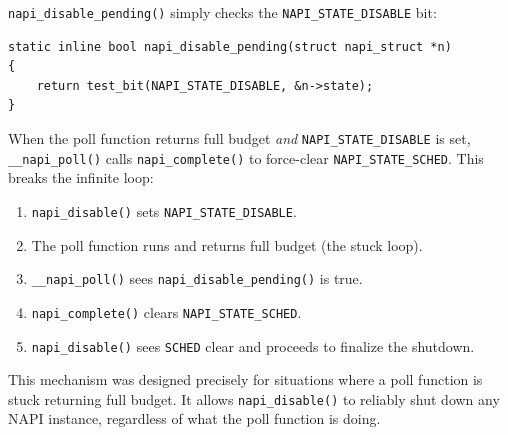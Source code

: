 \documentclass[11pt,a4paper,openany]{book}
\newcommand{\func}[1]{\texttt{#1()}}
\newcommand{\flag}[1]{\texttt{#1}}
\begin{document}
\func{napi\_disable\_pending} simply checks the \flag{NAPI\_STATE\_DISABLE}
bit:

\begin{lstlisting}[caption={\texttt{napi\_disable\_pending()} (include/linux/netdevice.h)}]
static inline bool napi_disable_pending(struct napi_struct *n)
{
    return test_bit(NAPI_STATE_DISABLE, &n->state);
}
\end{lstlisting}

When the poll function returns full budget \emph{and}
\flag{NAPI\_STATE\_DISABLE} is set, \func{\_\_napi\_poll} calls
\func{napi\_complete} to force-clear \flag{NAPI\_STATE\_SCHED}.  This
breaks the infinite loop:

\begin{enumerate}
\item \func{napi\_disable} sets \flag{NAPI\_STATE\_DISABLE}.
\item The poll function runs and returns full budget (the stuck loop).
\item \func{\_\_napi\_poll} sees \func{napi\_disable\_pending} is true.
\item \func{napi\_complete} clears \flag{NAPI\_STATE\_SCHED}.
\item \func{napi\_disable} sees \flag{SCHED} clear and proceeds to
    finalize the shutdown.
\end{enumerate}

This mechanism was designed precisely for situations where a poll
function is stuck returning full budget.  It allows \func{napi\_disable}
to reliably shut down any NAPI instance, regardless of what the poll
function is doing.
\end{document}
